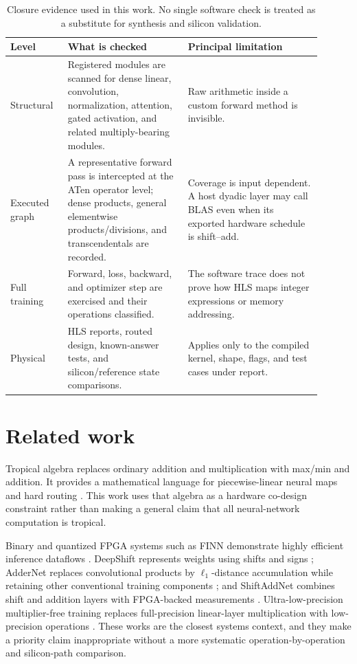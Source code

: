 \documentclass[10pt]{article}
\begin{document}
\begin{table}[t]
\centering
\caption{Closure evidence used in this work.  No single software check is
treated as a substitute for synthesis and silicon validation.}
\label{tab:closure-levels}
\small
\begin{tabular}{p{0.16\linewidth}p{0.35\linewidth}p{0.39\linewidth}}
\toprule
Level & What is checked & Principal limitation \\
\midrule
Structural & Registered modules are scanned for dense linear, convolution,
normalization, attention, gated activation, and related multiply-bearing
modules. & Raw arithmetic inside a custom forward method is invisible. \\
Executed graph & A representative forward pass is intercepted at the ATen
operator level; dense products, general elementwise products/divisions, and
transcendentals are recorded. & Coverage is input dependent.  A host dyadic
layer may call BLAS even when its exported hardware schedule is shift--add. \\
Full training & Forward, loss, backward, and optimizer step are exercised and
their operations classified. & The software trace does not prove how HLS maps
integer expressions or memory addressing. \\
Physical & HLS reports, routed design, known-answer tests, and silicon/reference
state comparisons. & Applies only to the compiled kernel, shape, flags, and
test cases under report. \\
\bottomrule
\end{tabular}
\end{table}

\section{Related work}

Tropical algebra replaces ordinary addition and multiplication with max/min
and addition.  It provides a mathematical language for piecewise-linear neural
maps and hard routing \cite{zhang2018tropical}.  This work uses that algebra as
a hardware co-design constraint rather than making a general claim that all
neural-network computation is tropical.

Binary and quantized FPGA systems such as FINN demonstrate highly efficient
inference dataflows \cite{umuroglu2017finn}.  DeepShift represents weights using
shifts and signs \cite{deepShift}; AdderNet replaces convolutional products by
$\ell_1$-distance accumulation while retaining other conventional training
components \cite{addernet}; and ShiftAddNet combines shift and addition layers
with FPGA-backed measurements \cite{shiftaddnet}.  Ultra-low-precision
multiplier-free training replaces full-precision linear-layer multiplication
with low-precision operations \cite{liu2023multfree}.  These works are the
closest systems context, and they make a priority claim inappropriate without
a more systematic operation-by-operation and silicon-path comparison.
\end{document}
